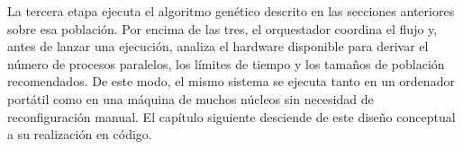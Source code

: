 La tercera etapa ejecuta el algoritmo genético descrito en las secciones anteriores sobre esa población. Por encima de las tres, el orquestador coordina el flujo y, antes de lanzar una ejecución, analiza el hardware disponible para derivar el número de procesos paralelos, los límites de tiempo y los tamaños de población recomendados. De este modo, el mismo sistema se ejecuta tanto en un ordenador portátil como en una máquina de muchos núcleos sin necesidad de reconfiguración manual. El capítulo siguiente desciende de este diseño conceptual a su realización en código.
